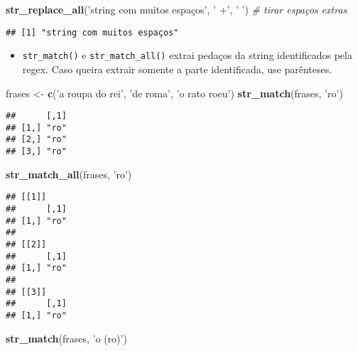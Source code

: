 \documentclass[]{book}
\newenvironment{Shaded}{\begin{snugshade}}{\end{snugshade}}
\newcommand{\KeywordTok}[1]{\textcolor[rgb]{0.13,0.29,0.53}{\textbf{{#1}}}}
\newcommand{\StringTok}[1]{\textcolor[rgb]{0.31,0.60,0.02}{{#1}}}
\newcommand{\CommentTok}[1]{\textcolor[rgb]{0.56,0.35,0.01}{\textit{{#1}}}}
\newcommand{\NormalTok}[1]{{#1}}
\providecommand{\tightlist}{%
  \setlength{\itemsep}{0pt}\setlength{\parskip}{0pt}}
\begin{document}
\begin{Shaded}
\begin{Highlighting}[]
\KeywordTok{str_replace_all}\NormalTok{(}\StringTok{'string     com    muitos espaços'}\NormalTok{, }\StringTok{' +'}\NormalTok{, }\StringTok{' '}\NormalTok{) }\CommentTok{# tirar espaços extras}
\end{Highlighting}
\end{Shaded}

\begin{verbatim}
## [1] "string com muitos espaços"
\end{verbatim}

\begin{itemize}
\tightlist
\item
  \texttt{str\_match()} e \texttt{str\_match\_all()} extrai pedaços da
  string identificados pela regex. Caso queira extrair somente a parte
  identificada, use parênteses.
\end{itemize}

\begin{Shaded}
\begin{Highlighting}[]
\NormalTok{frases <-}\StringTok{ }\KeywordTok{c}\NormalTok{(}\StringTok{'a roupa do rei'}\NormalTok{, }\StringTok{'de roma'}\NormalTok{, }\StringTok{'o rato roeu'}\NormalTok{)}
\KeywordTok{str_match}\NormalTok{(frases, }\StringTok{'ro'}\NormalTok{)}
\end{Highlighting}
\end{Shaded}

\begin{verbatim}
##      [,1]
## [1,] "ro"
## [2,] "ro"
## [3,] "ro"
\end{verbatim}

\begin{Shaded}
\begin{Highlighting}[]
\KeywordTok{str_match_all}\NormalTok{(frases, }\StringTok{'ro'}\NormalTok{)}
\end{Highlighting}
\end{Shaded}

\begin{verbatim}
## [[1]]
##      [,1]
## [1,] "ro"
## 
## [[2]]
##      [,1]
## [1,] "ro"
## 
## [[3]]
##      [,1]
## [1,] "ro"
\end{verbatim}

\begin{Shaded}
\begin{Highlighting}[]
\KeywordTok{str_match}\NormalTok{(frases, }\StringTok{'o (ro)'}\NormalTok{)}
\end{Highlighting}
\end{Shaded}
\end{document}
